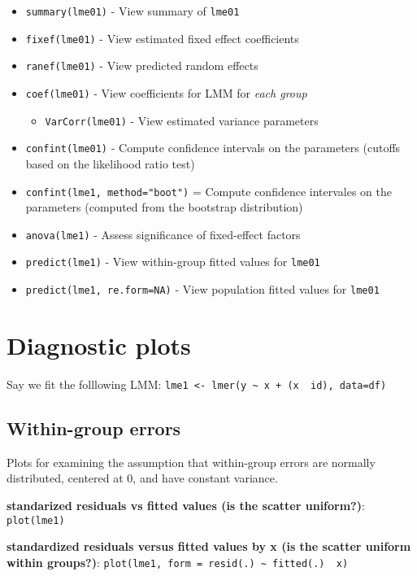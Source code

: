 \documentclass[
]{article}
\providecommand{\tightlist}{%
  \setlength{\itemsep}{0pt}\setlength{\parskip}{0pt}}
\begin{document}
\begin{itemize}
\tightlist
\item
  \texttt{summary(lme01)} - View summary of \texttt{lme01}
\item
  \texttt{fixef(lme01)} - View estimated fixed effect coefficients
\item
  \texttt{ranef(lme01)} - View predicted random effects
\item
  \texttt{coef(lme01)} - View coefficients for LMM for \emph{each group}

  \begin{itemize}
  \tightlist
  \item
    \texttt{VarCorr(lme01)} - View estimated variance parameters
  \end{itemize}
\item
  \texttt{confint(lme01)} - Compute confidence intervals on the
  parameters (cutoffs based on the likelihood ratio test)
\item
  \texttt{confint(lme1,\ method="boot")} = Compute confidence intervales
  on the parameters (computed from the bootstrap distribution)
\item
  \texttt{anova(lme1)} - Assess significance of fixed-effect factors
\item
  \texttt{predict(lme1)} - View within-group fitted values for
  \texttt{lme01}
\item
  \texttt{predict(lme1,\ re.form=NA)} - View population fitted values
  for \texttt{lme01}
\end{itemize}

\section{Diagnostic plots}\label{diagnostic-plots}

Say we fit the folllowing LMM:
\texttt{lme1\ \textless{}-\ lmer(y\ \textasciitilde{}\ x\ +\ (x\ \textbar{}\ id),\ data=df)}

\subsection{Within-group errors}\label{within-group-errors}

Plots for examining the assumption that within-group errors are normally
distributed, centered at 0, and have constant variance.

\textbf{standarized residuals vs fitted values (is the scatter
uniform?)}: \texttt{plot(lme1)}

\textbf{standardized residuals versus fitted values by x (is the scatter
uniform within groups?)}:
\texttt{plot(lme1,\ form\ =\ resid(.)\ \textasciitilde{}\ fitted(.)\ \textbar{}\ x)}
\end{document}
